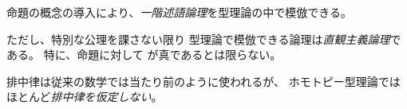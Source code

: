 \documentclass[index]{subfiles}
\begin{document}

命題の概念の導入により、\emph{一階述語論理}を型理論の中で模倣できる。





ただし、特別な公理を課さない限り
型理論で模倣できる論理は\emph{直観主義論理}である。
特に、命題に対して
が真であるとは限らない。



排中律は従来の数学では当たり前のように使われるが、
ホモトピー型理論ではほとんど\emph{排中律を仮定しない}。
\end{document}
